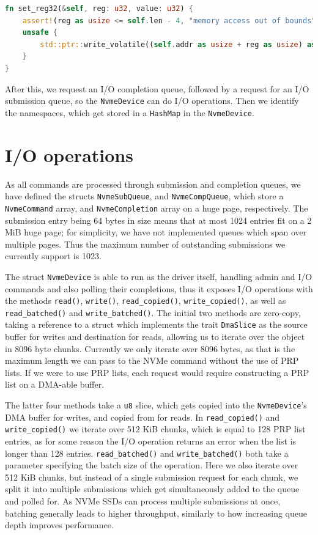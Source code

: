 \begin{lstlisting}[float, language=Rust, label=lst:reg32,caption=Writing to a 32-bit register]
fn set_reg32(&self, reg: u32, value: u32) {
    assert!(reg as usize <= self.len - 4, "memory access out of bounds");
    unsafe {
        std::ptr::write_volatile((self.addr as usize + reg as usize) as *mut u32, value);
    }
}
\end{lstlisting}

After this, we request an I/O completion queue, followed by a request for an I/O submission queue, so the \texttt{NvmeDevice} can do I/O operations. Then we identify the namespaces, which get stored in a \texttt{HashMap} in the \texttt{NvmeDevice}.

\section{I/O operations}\label{subsection:io}
As all commands are processed through submission and completion queues, we have defined the structs \texttt{NvmeSubQueue}, and \texttt{NvmeCompQueue}, which store a \texttt{NvmeCommand} array, and \texttt{NvmeCompletion} array on a huge page, respectively. The submission entry being 64 bytes in size means that at most 1024 entries fit on a 2 MiB huge page; for simplicity, we have not implemented queues which span over multiple pages. Thus the maximum number of outstanding submissions we currently support is 1023.

The struct \texttt{NvmeDevice} is able to run as the driver itself, handling admin and I/O commands and also polling their completions, thus it exposes I/O operations with the methods \texttt{read()}, \texttt{write()},  \texttt{read\_copied()}, \texttt{write\_copied()}, as well as \texttt{read\_batched()} and \texttt{write\_batched()}. The initial two methods are zero-copy, taking a reference to a struct which implements the trait \texttt{DmaSlice} as the source buffer for writes and destination for reads, allowing us to iterate over the object in 8096 byte chunks. Currently we only iterate over 8096 bytes, as that is the maximum length we can pass to the NVMe command without the use of PRP lists. If we were to use PRP lists, each request would require constructing a PRP list on a DMA-able buffer.

The latter four methods take a \texttt{u8} slice, which gets copied into the \texttt{NvmeDevice}'s DMA buffer for writes, and copied from for reads. In \texttt{read\_copied()} and \texttt{write\_copied()} we iterate over 512 KiB chunks, which is equal to 128 PRP list entries, as for some reason the I/O operation returns an error when the list is longer than 128 entries. \texttt{read\_batched()} and \texttt{write\_batched()} both take a parameter specifying the batch size of the operation. Here we also iterate over 512 KiB chunks, but instead of a single submission request for each chunk, we split it into multiple submissions which get simultaneously added to the queue and polled for. As NVMe SSDs can process multiple submissions at once, batching generally leads to higher throughput, similarly to how increasing queue depth improves performance.


